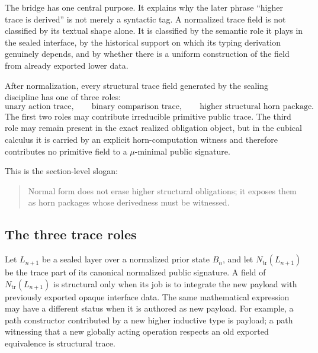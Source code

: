 \documentclass{lmcs}
\begin{document}
The bridge has one central purpose.  It explains why the later phrase ``higher trace is
derived'' is not merely a syntactic tag.  A normalized trace field is not classified by its
textual shape alone.  It is classified by the semantic role it plays in the sealed interface,
by the historical support on which its typing derivation genuinely depends, and by whether
there is a uniform construction of the field from already exported lower data.

After normalization, every structural trace field generated by the sealing discipline has one
of three roles:
\[
  \text{unary action trace},
  \qquad
  \text{binary comparison trace},
  \qquad
  \text{higher structural horn package}.
\]
The first two roles may contribute irreducible primitive public trace.  The third role may
remain present in the exact realized obligation object, but in the cubical calculus it is
carried by an explicit horn-computation witness and therefore contributes no primitive field
to a \(\mu\)-minimal public signature.

This is the section-level slogan:
\begin{quote}
Normal form does not erase higher structural obligations; it exposes them as horn packages
whose derivedness must be witnessed.
\end{quote}

\subsection{The three trace roles}

Let \(L_{n+1}\) be a sealed layer over a normalized prior state \(B_n\), and let
\(N_{\mathrm{tr}}(L_{n+1})\) be the trace part of its canonical normalized public signature.
A field of \(N_{\mathrm{tr}}(L_{n+1})\) is structural only when its job is to integrate the new
payload with previously exported opaque interface data.  The same mathematical expression
may have a different status when it is authored as new payload.  For example, a path
constructor contributed by a new higher inductive type is payload; a path witnessing that a
new globally acting operation respects an old exported equivalence is structural trace.
\end{document}

